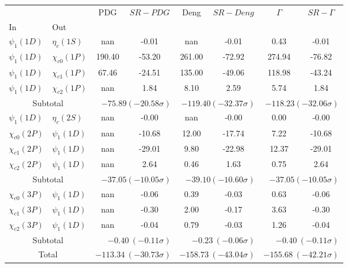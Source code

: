 \begin{tabular}{|l|l|c|c|c|c|c|c|}%
\hline%
&&PDG&$SR-PDG$&Deng&$SR-Deng$&$\Gamma$&$SR-\Gamma$\\%
In&Out&&&&&&\\%
\hline%
$\psi_{1}(1D)$&$\eta_{c}(1S)$&nan&-0.01&nan&-0.01&0.43&-0.01\\%
$\psi_{1}(1D)$&$\chi_{c0}(1P)$&190.40&-53.20&261.00&-72.92&274.94&-76.82\\%
$\psi_{1}(1D)$&$\chi_{c1}(1P)$&67.46&-24.51&135.00&-49.06&118.98&-43.24\\%
$\psi_{1}(1D)$&$\chi_{c2}(1P)$&nan&1.84&8.10&2.59&5.74&1.84\\%
\hline%
\hline%
\multicolumn{2}{|c|}{Subtotal}&\multicolumn{2}{|r|}{$-75.89 (-20.58\sigma)$}&\multicolumn{2}{|r|}{$-119.40 (-32.37\sigma)$}&\multicolumn{2}{|r|}{$-118.23 (-32.06\sigma)$}\\%
\hline%
\hline%
$\psi_{1}(1D)$&$\eta_{c}(2S)$&nan&-0.00&nan&-0.00&0.00&-0.00\\%
$\chi_{c0}(2P)$&$\psi_{1}(1D)$&nan&-10.68&12.00&-17.74&7.22&-10.68\\%
$\chi_{c1}(2P)$&$\psi_{1}(1D)$&nan&-29.01&9.80&-22.98&12.37&-29.01\\%
$\chi_{c2}(2P)$&$\psi_{1}(1D)$&nan&2.64&0.46&1.63&0.75&2.64\\%
\hline%
\hline%
\multicolumn{2}{|c|}{Subtotal}&\multicolumn{2}{|r|}{$-37.05 (-10.05\sigma)$}&\multicolumn{2}{|r|}{$-39.10 (-10.60\sigma)$}&\multicolumn{2}{|r|}{$-37.05 (-10.05\sigma)$}\\%
\hline%
\hline%
$\chi_{c0}(3P)$&$\psi_{1}(1D)$&nan&-0.06&0.39&-0.03&0.63&-0.06\\%
$\chi_{c1}(3P)$&$\psi_{1}(1D)$&nan&-0.30&2.00&-0.17&3.63&-0.30\\%
$\chi_{c2}(3P)$&$\psi_{1}(1D)$&nan&-0.04&0.79&-0.03&1.26&-0.04\\%
\hline%
\hline%
\multicolumn{2}{|c|}{Subtotal}&\multicolumn{2}{|r|}{$-0.40~(-0.11\sigma)$}&\multicolumn{2}{|r|}{$-0.23~(-0.06\sigma)$}&\multicolumn{2}{|r|}{$-0.40~(-0.11\sigma)$}\\%
\hline%
\hline%
\multicolumn{2}{|c|}{Total}&\multicolumn{2}{|r|}{$-113.34~(-30.73\sigma)$}&\multicolumn{2}{|r|}{$-158.73~(-43.04\sigma)$}&\multicolumn{2}{|r|}{$-155.68~(-42.21\sigma)$}\\%
\hline%
\end{tabular}